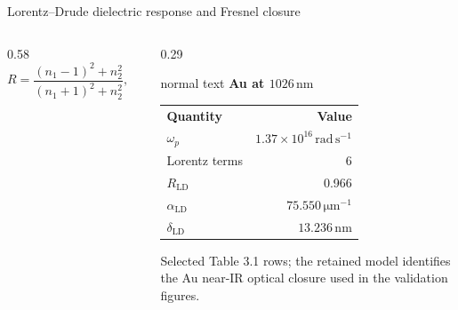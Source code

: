 \documentclass[aspectratio=169,10pt]{beamer}
\begin{document}
\begin{frame}[t]{Lorentz--Drude dielectric response and Fresnel closure}
\begin{columns}[T,totalwidth=0.95\textwidth]
\begin{column}{0.58\textwidth}
\[      \]
      \vspace{-0.25cm}
      \[
      R=\frac{(n_1-1)^2+n_2^2}{(n_1+1)^2+n_2^2},\qquad
      \alpha=\frac{2\omega}{c}n_2,\qquad \delta_{\mathrm{opt}}=\alpha^{-1}
      \]
    \end{column}
    \begin{column}{0.29\textwidth}
      \begin{beamercolorbox}[wd=\linewidth,sep=0.44em]{normal text}
        \small\textbf{\color{GVTeal}Au at \(1026\,\mathrm{nm}\)}\par
        \vspace{0.08cm}\scriptsize
        \begin{tabular}{@{}lr@{}}
          \rowcolor{GVTealTint}\textbf{Quantity} & \textbf{Value}\\
          \(\omega_p\) & \(1.37\times10^{16}\,\mathrm{rad\,s^{-1}}\)\\
          Lorentz terms & 6\\
          \(R_{\mathrm{LD}}\) & 0.966\\
          \(\alpha_{\mathrm{LD}}\) & \(75.550\,\mathrm{\mu m^{-1}}\)\\
          \(\delta_{\mathrm{LD}}\) & \(13.236\,\mathrm{nm}\)
        \end{tabular}\par
        \vspace{0.13cm}
        \scriptsize Selected Table 3.1 rows; the retained model identifies the Au near-IR optical closure used in the validation figures.
      \end{beamercolorbox}
    \end{column}
  \end{columns}
\end{frame}
\end{document}
